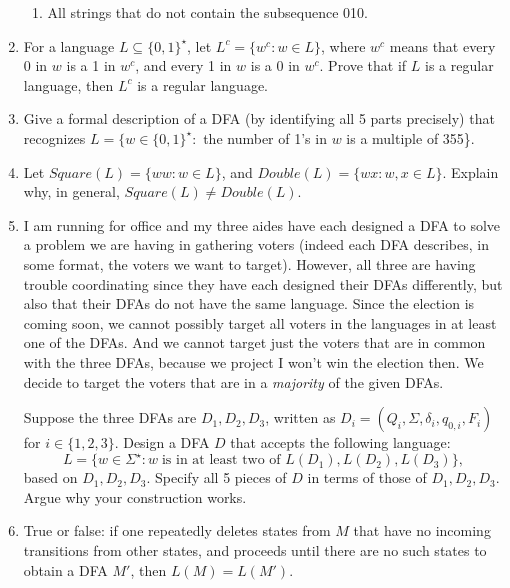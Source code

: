 \begin{enumerate}
\begin{enumerate}
\item {} All strings that do not contain the subsequence 010.

\end{enumerate}

\item {} For a language $L \subseteq \{0,1\}^\star$, let $L^c = \{w^c : w \in L\}$, where $w^c$ means that every 0 in $w$ is a 1 in $w^c$, and every 1 in $w$ is a 0 in $w^c$.
Prove that if $L$ is a regular language, then $L^c$ is a regular language.

\item {} Give a formal description of a DFA (by identifying all 5 parts precisely) that recognizes $L = \{w \in \{0,1\}^\star :$ the number of 1's in $w$ is a multiple of 355\}.

\item  \label{ex2017fsquaredouble}  Let $Square(L) = \{ ww : w \in L\}$, and $Double(L) = \{wx : w, x \in L \}$.
Explain why, in general, $Square(L) \ne Double(L)$.

\item {} I am running for office and my three aides have each designed a DFA to solve a problem we are having in gathering voters (indeed each DFA describes, in some format, the voters we want to target).
However, all three are having trouble coordinating since they have each designed their DFAs differently, but also that their DFAs do not have the same language.
Since the election is coming soon, we cannot possibly target all voters in the languages in at least one of the DFAs.
And we cannot target just the voters that are in common with the three DFAs, because we project I won't win the election then.
We decide to target the voters that are in a \emph{majority} of the given DFAs.

Suppose the three DFAs are $D_1, D_2, D_3$, written as $D_i = (Q_i, \Sigma, \delta_i, q_{0,i}, F_i)$ for $i \in \{1,2,3\}$.
Design a DFA $D$ that accepts the following language:
\[
L = \{ w \in \Sigma^\star : w\;\text{is in at least two of $L(D_1), L(D_2), L(D_3)$}\},
\]
based on $D_1, D_2, D_3$.
Specify all 5 pieces of $D$ in terms of those of $D_1, D_2, D_3$.
Argue why your construction works.

\item {} True or false: if one repeatedly deletes states from $M$ that have no incoming transitions from other states, and proceeds until there are no such states to obtain a DFA $M'$, then $L(M) = L(M')$.


\end{enumerate}
